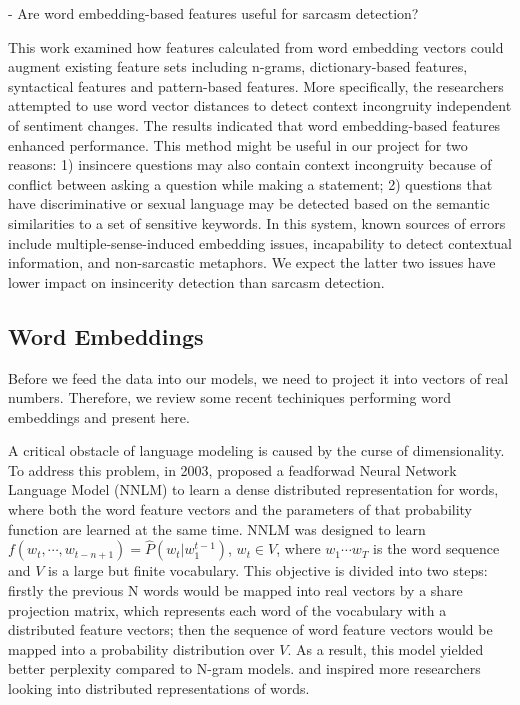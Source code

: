 \documentclass[12pt]{diazessay} %
\begin{document}
- Are word embedding-based features useful for sarcasm detection? \citep{joshi2016}

This work examined how features calculated from word embedding vectors could augment existing feature sets including n-grams, dictionary-based features, syntactical features and pattern-based features. More specifically, the researchers attempted to use word vector distances to detect context incongruity independent of sentiment changes. The results indicated that word embedding-based features enhanced performance. This method might be useful in our project for two reasons: 1) insincere questions may also contain context incongruity because of conflict between asking a question while making a statement; 2) questions that have discriminative or sexual language may be detected based on the semantic similarities to a set of sensitive keywords.  In this system, known sources of errors include multiple-sense-induced embedding issues, incapability to detect contextual information, and non-sarcastic metaphors. We expect the latter two issues have lower impact on insincerity detection than sarcasm detection. 


\subsection*{Word Embeddings}
Before we feed the data into our models, we need to project it into vectors of real numbers. Therefore, we review some recent techiniques performing word embeddings and present here.

A critical obstacle of language modeling is caused by the curse of dimensionality. To address this problem, in 2003, \citep{bengio2003neural} proposed a feadforwad Neural Network Language Model (NNLM) to learn a dense distributed representation\citep{hinton1986learning} for words, where both the word feature vectors and the parameters of that probability function are learned at the same time. NNLM was designed to learn $f \left( w _ { t } , \cdots , w _ { t - n + 1 } \right) = \hat { P } \left( w _ { t } | w _ { 1 } ^ { t - 1 } \right)$, $w _ { t } \in V$, where $w_1 \cdots w_T$ is the word sequence and $V$ is a large but finite vocabulary. This objective is divided into two steps: firstly the previous N words would be mapped into real vectors by a share projection matrix, which represents each word of the vocabulary with a distributed feature vectors; then the sequence of word feature vectors would be mapped into a probability distribution over $V$. As a result, this model yielded better perplexity compared to N-gram models. and inspired more researchers looking into distributed representations of words.
\end{document}
